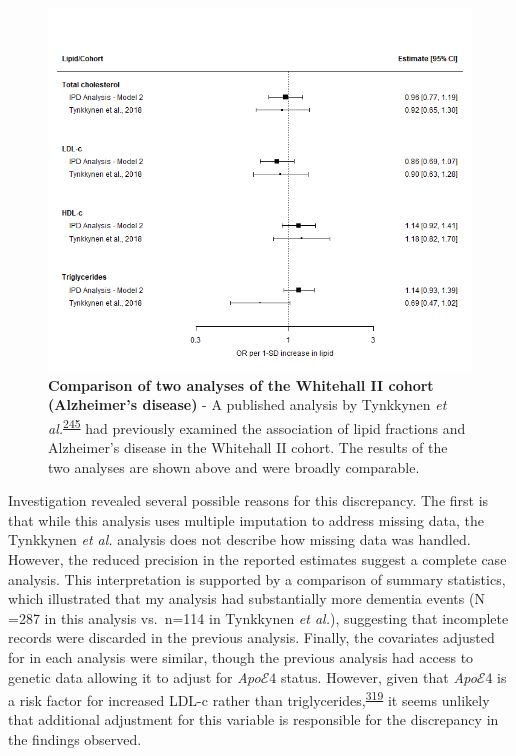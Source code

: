 \documentclass[a4paper, twoside]{templates/ociamthesis}
\begin{document}
~





\begin{figure}[H]
\includegraphics[width=1\linewidth]{figures/ipd/whitehall_comparison_ad} \caption[Comparison of two analyses of the Whitehall II cohort (Alzheimer's disease)]{\textbf{Comparison of two analyses of the Whitehall II cohort (Alzheimer's disease)} - A published analysis by Tynkkynen \emph{et al.}\textsuperscript{\protect\hyperlink{ref-tynkkynen2018}{245}} had previously examined the association of lipid fractions and Alzheimer's disease in the Whitehall II cohort. The results of the two analyses are shown above and were broadly comparable.}\label{fig:whitehallComparisonAd}
\end{figure}

Investigation revealed several possible reasons for this discrepancy. The first is that while this analysis uses multiple imputation to address missing data, the Tynkkynen \emph{et al.} analysis does not describe how missing data was handled. However, the reduced precision in the reported estimates suggest a complete case analysis. This interpretation is supported by a comparison of summary statistics, which illustrated that my analysis had substantially more dementia events (N =287 in this analysis vs.~n=114 in Tynkkynen \emph{et al.}), suggesting that incomplete records were discarded in the previous analysis. Finally, the covariates adjusted for in each analysis were similar, though the previous analysis had access to genetic data allowing it to adjust for \emph{Apo}\(\mathcal{E}4\) status. However, given that \emph{Apo}\(\mathcal{E}4\) is a risk factor for increased LDL-c rather than triglycerides,\textsuperscript{\protect\hyperlink{ref-bennet2007}{319}} it seems unlikely that additional adjustment for this variable is responsible for the discrepancy in the findings observed.
\end{document}
